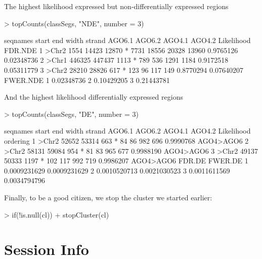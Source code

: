 \documentclass[a4paper]{article}
\begin{document}
The highest likelihood expressed but non-differentially expressed regions

\begin{Schunk}
\begin{Sinput}
> topCounts(classSegs, "NDE", number = 3)
\end{Sinput}
\begin{Soutput}
  seqnames  start    end width strand AGO6.1 AGO6.2 AGO4.1 AGO4.2 Likelihood    FDR.NDE
1    >Chr2   1554  14423 12870      *   7731  18556  20328  13960  0.9765126 0.02348736
2    >Chr1 446325 447437  1113      *    789    536   1291   1184  0.9172518 0.05311779
3    >Chr2  28210  28826   617      *    123     96    117    149  0.8770294 0.07640207
    FWER.NDE
1 0.02348736
2 0.10429205
3 0.21443781
\end{Soutput}
\end{Schunk}

And the highest likelihood differentially expressed regions

\begin{Schunk}
\begin{Sinput}
> topCounts(classSegs, "DE", number = 3)
\end{Sinput}
\begin{Soutput}
  seqnames start   end width strand AGO6.1 AGO6.2 AGO4.1 AGO4.2 Likelihood  ordering
1    >Chr2 52652 53314   663      *     84     86    982    696  0.9990768 AGO4>AGO6
2    >Chr2 58131 59084   954      *     81     83    965    677  0.9988190 AGO4>AGO6
3    >Chr2 49137 50333  1197      *    102    117    992    719  0.9986207 AGO4>AGO6
        FDR.DE      FWER.DE
1 0.0009231629 0.0009231629
2 0.0010520713 0.0021030523
3 0.0011611569 0.0034794796
\end{Soutput}
\end{Schunk}

Finally, to be a good citizen, we stop the cluster we started earlier:

\begin{Schunk}
\begin{Sinput}
> if(!is.null(cl))
+     stopCluster(cl)
\end{Sinput}
\end{Schunk}

\section*{Session Info}
\end{document}
